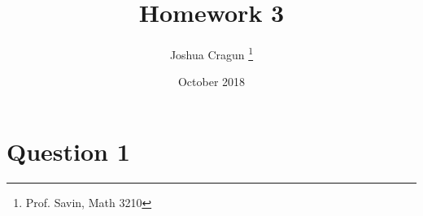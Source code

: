 \documentclass[12pt, letterpaper]{article}
\title{Homework 3}
\author{Joshua Cragun \thanks{Prof. Savin, Math 3210}}
\date{October 2018}
\begin{document}
\begin{titlepage}
\maketitle
\end{titlepage}

\section*{Question 1}
\end{document}

